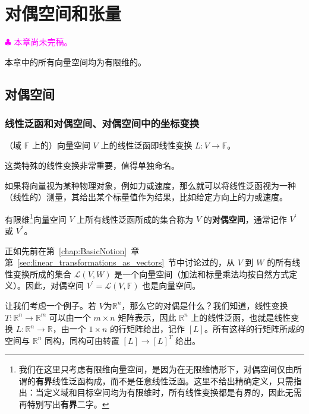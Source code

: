 
\chapter{对偶空间和张量}\label{chap:DualandTensor}

\textcolor{magenta}{$\clubsuit$ 本章尚未完稿。}

本章中的所有向量空间均为有限维的。

\section{对偶空间}

\subsection{线性泛函和对偶空间、对偶空间中的坐标变换}

\begin{definition}
    （域 $\mathbb{F}$ 上的）向量空间 $V$ 上的线性泛函即线性变换 $L:V\to\mathbb{F}$。
\end{definition}

这类特殊的线性变换非常重要，值得单独命名。%

如果将向量视为某种物理对象，例如力或速度，那么就可以将线性泛函视为一种（线性的）测量，其给出某个标量值作为结果，比如给定方向上的力或速度。%

\begin{definition}
    有限维\footnote{我们在这里只考虑有限维向量空间，是因为在无限维情形下，对偶空间仅由所谓的{\bf 有界}线性泛函构成，而不是任意线性泛函。这里不给出精确定义，只需指出：当定义域和目标空间均为有限维时，所有线性变换都是有界的，因此无需再特别写出{\bf 有界}二字。}向量空间 $V$ 上所有线性泛函所成的集合称为 $V$ 的{\bf 对偶空间}，通常记作 $V^\prime$ 或 $V^*$。
\end{definition}

正如先前在第~\ref{chap:BasicNotion}~章第~\ref{sec:linear_transformations_as_vectors}~节中讨论过的，从 $V$ 到 $W$ 的所有线性变换所成的集合 $\mathcal{L}(V,W)$ 是一个向量空间（加法和标量乘法均按自然方式定义）。因此，对偶空间 $V^\prime = \mathcal{L}(V, \mathbb{F})$ 也是向量空间。

让我们考虑一个例子。若 $V$为$\mathbb{R}^n$，那么它的对偶是什么？我们知道，线性变换 $T:\mathbb{R}^n\to\mathbb{R}^m$ 可以由一个 $m\times n$ 矩阵表示，因此 $\mathbb{R}^n$ 上的线性泛函，也就是线性变换 $L:\mathbb{R}^n\to\mathbb{R}$，由一个 $1\times n$ 的行矩阵给出，记作 $[L]$。所有这样的行矩阵所成的空间与 $\mathbb{R}^n$ 同构，同构可由转置 $[L]\to [L]^T$ 给出。

